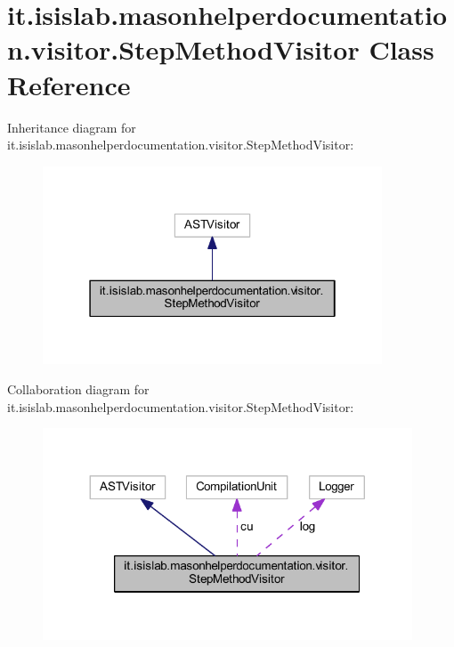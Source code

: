 \hypertarget{classit_1_1isislab_1_1masonhelperdocumentation_1_1visitor_1_1_step_method_visitor}{\section{it.\-isislab.\-masonhelperdocumentation.\-visitor.\-Step\-Method\-Visitor Class Reference}
\label{classit_1_1isislab_1_1masonhelperdocumentation_1_1visitor_1_1_step_method_visitor}
}


Inheritance diagram for it.\-isislab.\-masonhelperdocumentation.\-visitor.\-Step\-Method\-Visitor\-:\nopagebreak
\begin{figure}[H]
\begin{center}
\leavevmode
\includegraphics[width=286pt]{classit_1_1isislab_1_1masonhelperdocumentation_1_1visitor_1_1_step_method_visitor__inherit__graph}
\end{center}
\end{figure}


Collaboration diagram for it.\-isislab.\-masonhelperdocumentation.\-visitor.\-Step\-Method\-Visitor\-:\nopagebreak
\begin{figure}[H]
\begin{center}
\leavevmode
\includegraphics[width=311pt]{classit_1_1isislab_1_1masonhelperdocumentation_1_1visitor_1_1_step_method_visitor__coll__graph}
\end{center}
\end{figure}
